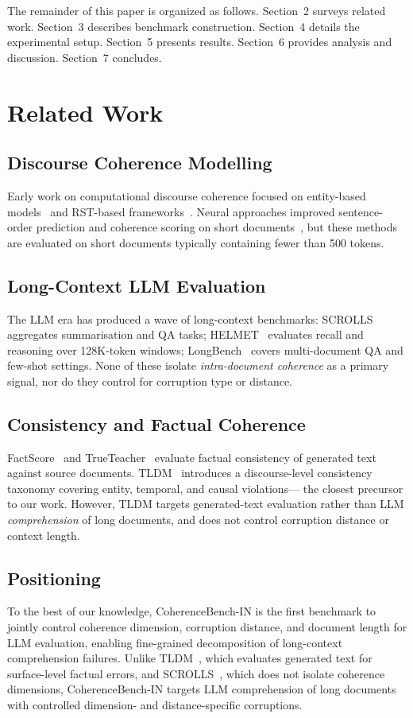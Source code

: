 \documentclass{llncs}
\begin{document}
The remainder of this paper is organized as follows.
Section~2 surveys related work.
Section~3 describes benchmark construction.
Section~4 details the experimental setup.
Section~5 presents results.
Section~6 provides analysis and discussion.
Section~7 concludes.

\section{Related Work}
\subsection{Discourse Coherence Modelling}
Early work on computational discourse coherence focused on entity-based models~\cite{barzilay2008}
and RST-based frameworks~\cite{mann1988}.
Neural approaches improved sentence-order prediction and coherence scoring
on short documents~\cite{logeswaran2018,cervone2018},
but these methods are evaluated on short documents typically containing fewer than 500 tokens.

\subsection{Long-Context LLM Evaluation}
The LLM era has produced a wave of long-context benchmarks:
SCROLLS~\cite{shaham2022} aggregates summarisation and QA tasks;
HELMET~\cite{yen2024} evaluates recall and reasoning over 128K-token windows;
LongBench~\cite{bai2024} covers multi-document QA and few-shot settings.
None of these isolate \emph{intra-document coherence} as a primary signal,
nor do they control for corruption type or distance.

\subsection{Consistency and Factual Coherence}
FactScore~\cite{min2023} and TrueTeacher~\cite{gekhman2023} evaluate factual consistency
of generated text against source documents.
TLDM~\cite{hamilton2025tldm} introduces a discourse-level consistency taxonomy
covering entity, temporal, and causal violations---
the closest precursor to our work.
However, TLDM targets generated-text evaluation rather than
LLM \emph{comprehension} of long documents, and does not control
corruption distance or context length.

\subsection{Positioning}
To the best of our knowledge, CoherenceBench-IN is the first benchmark to jointly control
coherence dimension, corruption distance, and document length
for LLM evaluation, enabling fine-grained decomposition of
long-context comprehension failures.
Unlike TLDM~\cite{kasner2024}, which evaluates generated text for surface-level factual errors, and SCROLLS~\cite{shaham2022}, which does not isolate coherence dimensions, CoherenceBench-IN targets LLM comprehension of long documents with controlled dimension- and distance-specific corruptions.
\end{document}
